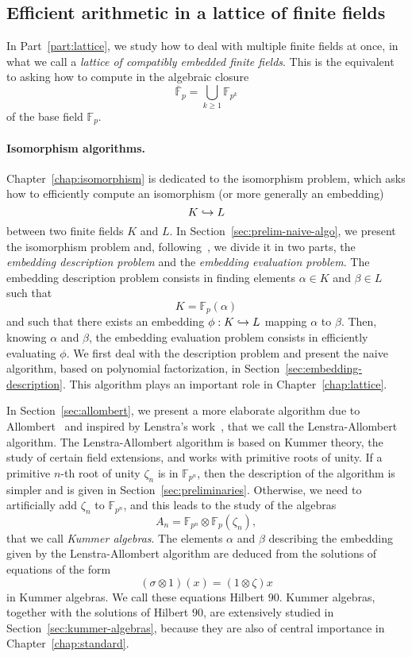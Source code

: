 \subsection{Efficient arithmetic in a lattice of finite fields}
In Part~\ref{part:lattice}, we study how to deal with multiple finite fields
at once, in what we call a \emph{lattice of compatibly embedded finite fields}.
This is the equivalent to asking how to compute in the algebraic closure
\[
  \bar{\mathbb{F}}_{p} = \bigcup_{k\geq1}\mathbb{F}_{p^k}
\]
of the base field $\mathbb{F}_p$.

\paragraph{Isomorphism algorithms.}
Chapter~\ref{chap:isomorphism} is dedicated to the isomorphism problem, which
asks how to efficiently compute an isomorphism (or more generally an embedding)
\[
  K \hookrightarrow L
\]
between two finite fields $K$ and $L$. In Section~\ref{sec:prelim-naive-algo},
we present the isomorphism problem and, following~\cite{BDDFS17}, we divide it
in two parts, the \emph{embedding description problem} and the \emph{embedding
evaluation problem}. The embedding description problem consists in finding
elements $\alpha\in K$ and $\beta\in L$ such that
\[
  K = \mathbb{F}_{p}(\alpha)
\]
and such that there exists an embedding $\phi:K\hookrightarrow L$ mapping $\alpha$ to
$\beta$. Then, knowing $\alpha$ and $\beta$, the embedding evaluation problem
consists in efficiently evaluating $\phi$. We first deal with the description
problem and present the naive algorithm, based on polynomial factorization, in
Section~\ref{sec:embedding-description}. This algorithm plays an important role
in Chapter~\ref{chap:lattice}.

In Section~\ref{sec:allombert}, we present a more elaborate algorithm due to
Allombert~\cite{Allombert02} and inspired by Lenstra's work~\cite{Lenstra91},
that we call the Lenstra-Allombert algorithm. The Lenstra-Allombert algorithm is
based on Kummer theory, the study of certain field extensions, and works with
primitive roots of unity. If a primitive $n$-th root of unity $\zeta_n$ is in
$\mathbb{F}_{p^n}$, then the description of the algorithm is simpler and is
given in Section~\ref{sec:preliminaries}. Otherwise, we need to artificially add
$\zeta_n$ to $\mathbb{F}_{p^n}$, and this leads to the study of the algebras
\[
  A_n = \mathbb{F}_{p^{n}}\otimes\mathbb{F}_{p}(\zeta_n),
\]
that we call \emph{Kummer algebras}. The elements $\alpha$ and $\beta$
describing the embedding given by the Lenstra-Allombert algorithm are deduced
from the solutions of equations of the form
\[
  (\sigma\otimes 1)(x) = (1\otimes\zeta)x
\]
in Kummer algebras. We call these equations Hilbert $90$.
Kummer algebras, together with the solutions of Hilbert $90$, are
extensively studied in Section~\ref{sec:kummer-algebras}, because they are also
of central importance in Chapter~\ref{chap:standard}.

